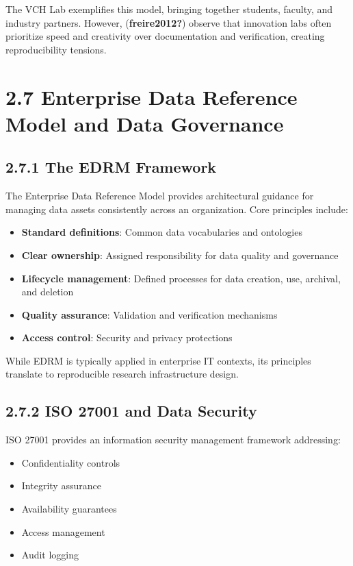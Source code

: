 \documentclass[
  oneside,
  open=any]{scrbook}
\providecommand{\tightlist}{%
  \setlength{\itemsep}{0pt}\setlength{\parskip}{0pt}}\usepackage{longtable,booktabs,array}
\begin{document}
The VCH Lab exemplifies this model, bringing together students, faculty,
and industry partners. However, (\textbf{freire2012?}) observe that
innovation labs often prioritize speed and creativity over documentation
and verification, creating reproducibility tensions.

\section{2.7 Enterprise Data Reference Model and Data
Governance}\label{enterprise-data-reference-model-and-data-governance}

\subsection{2.7.1 The EDRM Framework}\label{the-edrm-framework}

The Enterprise Data Reference Model provides architectural guidance for
managing data assets consistently across an organization. Core
principles include:

\begin{itemize}
\tightlist
\item
  \textbf{Standard definitions}: Common data vocabularies and ontologies
\item
  \textbf{Clear ownership}: Assigned responsibility for data quality and
  governance
\item
  \textbf{Lifecycle management}: Defined processes for data creation,
  use, archival, and deletion
\item
  \textbf{Quality assurance}: Validation and verification mechanisms
\item
  \textbf{Access control}: Security and privacy protections
\end{itemize}

While EDRM is typically applied in enterprise IT contexts, its
principles translate to reproducible research infrastructure design.

\subsection{2.7.2 ISO 27001 and Data
Security}\label{iso-27001-and-data-security}

ISO 27001 provides an information security management framework
addressing:

\begin{itemize}
\tightlist
\item
  Confidentiality controls
\item
  Integrity assurance
\item
  Availability guarantees
\item
  Access management
\item
  Audit logging
\end{itemize}
\end{document}
